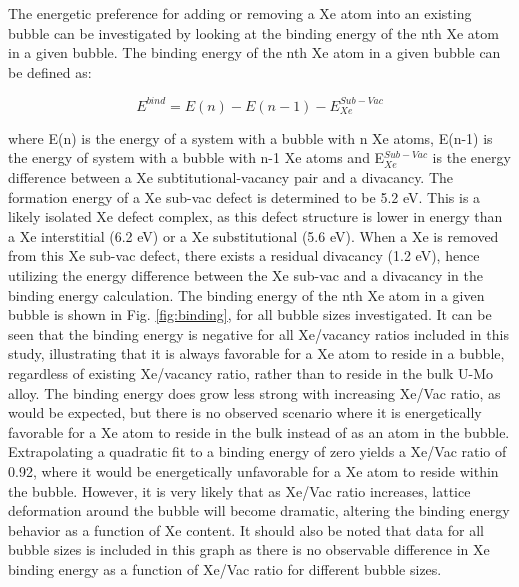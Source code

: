 \documentclass[review]{elsarticle}
\begin{document}
\FloatBarrier

The energetic preference for adding or removing a Xe atom into an existing bubble can be investigated by looking at the binding energy of the nth Xe atom in a given bubble. The binding energy of the nth Xe atom in a given bubble can be defined as:

\begin{equation}
\label{eq:bind}
E^{bind}= E(n)-E(n-1) - E_{Xe}^{Sub-Vac}
\end{equation}

where E(n) is the energy of a system with a bubble with n Xe atoms, E(n-1) is the energy of system with a bubble with n-1 Xe atoms and E$_{Xe}^{Sub-Vac}$ is the energy difference between a Xe subtitutional-vacancy pair and a divacancy. The formation energy of a Xe sub-vac defect is determined to be 5.2 eV. This is a likely isolated Xe defect complex, as this defect structure is lower in energy than a Xe interstitial (6.2 eV) or a Xe substitutional (5.6 eV). When a Xe is removed from this Xe sub-vac defect, there exists a residual divacancy (1.2 eV), hence utilizing the energy difference between the Xe sub-vac and a divacancy in the binding energy calculation. The binding energy of the nth Xe atom in a given bubble is shown in Fig. \ref{fig:binding}, for all bubble sizes investigated. It can be seen that the binding energy is negative for all Xe/vacancy ratios included in this study, illustrating that it is always favorable for a Xe atom to reside in a bubble, regardless of existing Xe/vacancy ratio, rather than to reside in the bulk U-Mo alloy. The binding energy does grow less strong with increasing Xe/Vac ratio, as would be expected, but there is no observed scenario where it is energetically favorable for a Xe atom to reside in the bulk instead of as an atom in the bubble. Extrapolating a quadratic fit to a binding energy of zero yields a Xe/Vac ratio of 0.92, where it would be energetically unfavorable for a Xe atom to reside within the bubble. However, it is very likely that as Xe/Vac ratio increases, lattice deformation around the bubble will become dramatic, altering the binding energy behavior as a function of Xe content. It should also be noted that data for all bubble sizes is included in this graph as there is no observable difference in Xe binding energy as a function of Xe/Vac ratio for different bubble sizes. 
\end{document}
